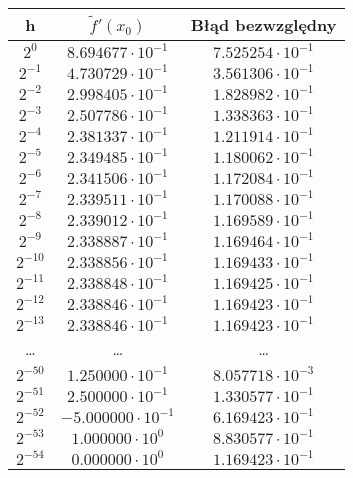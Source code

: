 \documentclass{article}
\begin{document}
\begin{table}[h!]
    \centering
    \begin{tabular}{|c|c|c|}
        \hline
        h & $\tilde{f}'(x_0)$ & Błąd bezwzględny \\
        \hline
        $2^{0}$ & $8.694677 \cdot 10^{-1}$ & $7.525254 \cdot 10^{-1}$ \\
        \hline
        $2^{-1}$ & $4.730729 \cdot 10^{-1}$ & $3.561306 \cdot 10^{-1}$ \\
        \hline
        $2^{-2}$ & $2.998405 \cdot 10^{-1}$ & $1.828982 \cdot 10^{-1}$ \\
        \hline
        $2^{-3}$ & $2.507786 \cdot 10^{-1}$ & $1.338363 \cdot 10^{-1}$ \\
        \hline
        $2^{-4}$ & $2.381337 \cdot 10^{-1}$ & $1.211914 \cdot 10^{-1}$ \\
        \hline
        $2^{-5}$ & $2.349485 \cdot 10^{-1}$ & $1.180062 \cdot 10^{-1}$ \\
        \hline
        $2^{-6}$ & $2.341506 \cdot 10^{-1}$ & $1.172084 \cdot 10^{-1}$ \\
        \hline
        $2^{-7}$ & $2.339511 \cdot 10^{-1}$ & $1.170088 \cdot 10^{-1}$ \\
        \hline
        $2^{-8}$ & $2.339012 \cdot 10^{-1}$ & $1.169589 \cdot 10^{-1}$ \\
        \hline
        $2^{-9}$ & $2.338887 \cdot 10^{-1}$ & $1.169464 \cdot 10^{-1}$ \\
        \hline
        $2^{-10}$ & $2.338856 \cdot 10^{-1}$ & $1.169433 \cdot 10^{-1}$ \\
        \hline
        $2^{-11}$ & $2.338848 \cdot 10^{-1}$ & $1.169425 \cdot 10^{-1}$ \\
        \hline
        $2^{-12}$ & $2.338846 \cdot 10^{-1}$ & $1.169423 \cdot 10^{-1}$ \\
        \hline
        $2^{-13}$ & $2.338846 \cdot 10^{-1}$ & $1.169423 \cdot 10^{-1}$ \\
        \hline
        \dots & \dots & \dots \\
        \hline
        $2^{-50}$ & $1.250000 \cdot 10^{-1}$ & $8.057718 \cdot 10^{-3}$ \\
        \hline
        $2^{-51}$ & $2.500000 \cdot 10^{-1}$ & $1.330577 \cdot 10^{-1}$ \\
        \hline
        $2^{-52}$ & $-5.000000 \cdot 10^{-1}$ & $6.169423 \cdot 10^{-1}$ \\
        \hline
        $2^{-53}$ & $1.000000 \cdot 10^{0}$ & $8.830577 \cdot 10^{-1}$ \\
        \hline
        $2^{-54}$ & $0.000000 \cdot 10^{0}$ & $1.169423 \cdot 10^{-1}$ \\
        \hline
    \end{tabular}
    \label{tab:pochodna}
\end{table}\\
\end{document}
